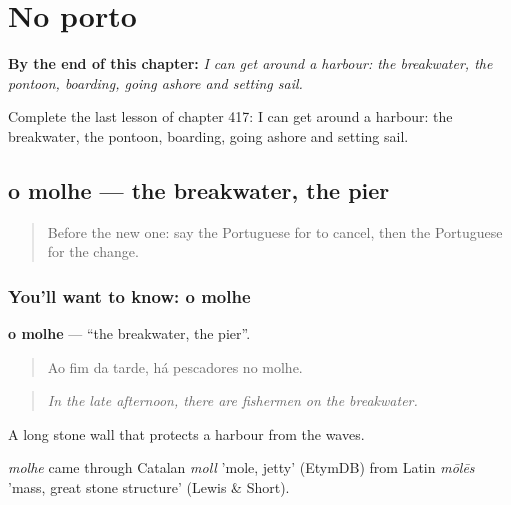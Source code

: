 
\chapter{No porto}
\label{ch:pt-no-porto}

\begin{chapteropening}
\textbf{By the end of this chapter:} \emph{I can get around a harbour: the breakwater, the pontoon, boarding, going ashore and setting sail.}

Complete the last lesson of chapter 417: I can get around a harbour: the breakwater, the pontoon, boarding, going ashore and setting sail.
\end{chapteropening}

\section[o molhe]{o molhe — the breakwater, the pier}

\label{lesson:PT-C417-molhe}



\begin{quote}
Before the new one: say the Portuguese for to cancel, then the Portuguese for the change.
\end{quote}

\subsection*{You'll want to know: o molhe}
\textbf{o molhe} — \textquotedblleft{}the breakwater, the pier\textquotedblright{}.

\begin{quote}
Ao fim da tarde, há pescadores no molhe.
\end{quote}

\begin{quote}
\emph{In the late afternoon, there are fishermen on the breakwater.}
\end{quote}

A long stone wall that protects a harbour from the waves.

\begin{cousinweb}
\emph{molhe} came through Catalan \emph{moll} 'mole, jetty' (EtymDB) from Latin \emph{mōlēs} 'mass, great stone structure' (Lewis \& Short).
\end{cousinweb}

